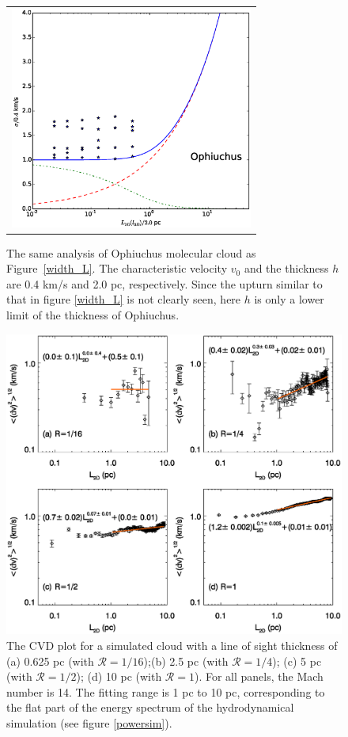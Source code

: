 \documentclass[iop,revtex4]{emulateapj}
\begin{document}
\begin{figure}[htbp]
\centering
\begin{tabular}{c}
\includegraphics[width=8cm]{oph_width_L.eps}\\
\end{tabular}
\caption{ The same analysis of Ophiuchus molecular cloud as Figure~\ref{width_L}. The characteristic velocity $v_0$ and the thickness $h$ are 0.4 km/s and 2.0 pc, respectively. Since the upturn similar to that in figure \ref{width_L} is not clearly seen, here $h$ is only a lower limit of the thickness of Ophiuchus. \label{oph_width_L}}
\end{figure}


\begin{figure}[htbp]
\begin{minipage}[b]{\textwidth}
\centering
  \includegraphics[width=16cm]{cvd_all.eps}
\end{minipage}
\caption{ The CVD plot for a simulated cloud with a line of sight thickness of (a) 0.625 pc (with $\mathcal{R}=1/16$);(b) 2.5 pc (with $\mathcal{R}=1/4$); (c) 5 pc (with $\mathcal{R}=1/2$); (d) 10 pc (with $\mathcal{R}=1$). For all panels, the Mach number is 14. The fitting range is 1 pc to 10 pc, corresponding to the flat part of the energy spectrum of the hydrodynamical simulation (see figure \ref{powersim}).}\label{cvd_all}
\end{figure}
\end{document}

